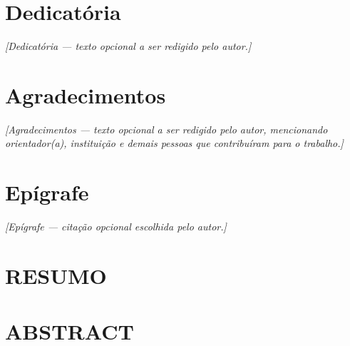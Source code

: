 \documentclass[12pt,a4paper,openright,oneside]{memoir}
\numberwithin{equation}{chapter}
\begin{document}
\chapter*{Dedicatória}
\begin{flushright}
\textit{[Dedicatória — texto opcional a ser redigido pelo autor.]}
\end{flushright}
\clearpage

\chapter*{Agradecimentos}
\textit{[Agradecimentos — texto opcional a ser redigido pelo autor,
mencionando orientador(a), instituição e demais pessoas que
contribuíram para o trabalho.]}
\clearpage

\chapter*{Epígrafe}
\begin{flushright}
\textit{[Epígrafe — citação opcional escolhida pelo autor.]}
\end{flushright}
\clearpage

\chapter*{RESUMO}

\clearpage

\chapter*{ABSTRACT}

\clearpage

\renewcommand{\listfigurename}{LISTA DE FIGURAS}
\listoffigures*
\clearpage

\renewcommand{\listtablename}{LISTA DE TABELAS}
\listoftables*
\clearpage
\end{document}
